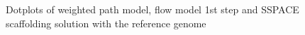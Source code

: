 \documentclass[12pt]{article}
\begin{document}
\begin{figure}[h!]
\begin{center}
{
}
\end{center}
\caption{Dotplots of weighted path model, flow model 1st step and SSPACE scaffolding solution with the reference genome}
\label{fig:dotpinus}
\end{figure}


\clearpage
\end{document}
